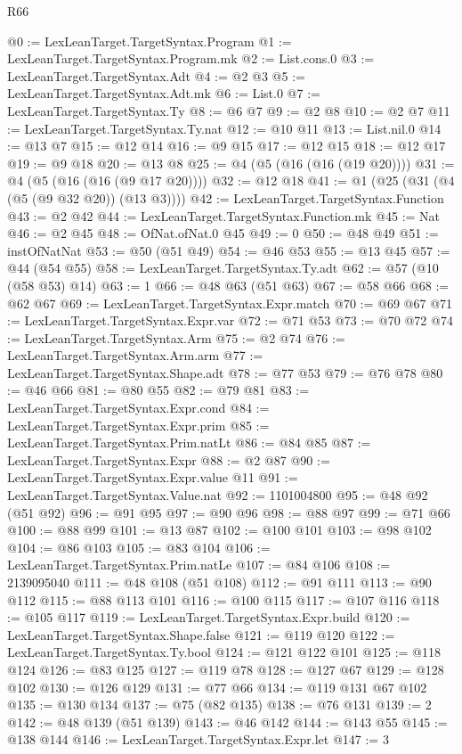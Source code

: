 \begin{lexlean}{R66}
\begin{coremodule}
@0 := LexLeanTarget.TargetSyntax.Program
@1 := LexLeanTarget.TargetSyntax.Program.mk
@2 := List.cons.{0}
@3 := LexLeanTarget.TargetSyntax.Adt
@4 := @2 @3
@5 := LexLeanTarget.TargetSyntax.Adt.mk
@6 := List.{0}
@7 := LexLeanTarget.TargetSyntax.Ty
@8 := @6 @7
@9 := @2 @8
@10 := @2 @7
@11 := LexLeanTarget.TargetSyntax.Ty.nat
@12 := @10 @11
@13 := List.nil.{0}
@14 := @13 @7
@15 := @12 @14
@16 := @9 @15
@17 := @12 @15
@18 := @12 @17
@19 := @9 @18
@20 := @13 @8
@25 := @4 (@5 (@16 (@16 (@19 @20))))
@31 := @4 (@5 (@16 (@16 (@9 @17 @20))))
@32 := @12 @18
@41 := @1 (@25 (@31 (@4 (@5 (@9 @32 @20)) (@13 @3))))
@42 := LexLeanTarget.TargetSyntax.Function
@43 := @2 @42
@44 := LexLeanTarget.TargetSyntax.Function.mk
@45 := Nat
@46 := @2 @45
@48 := OfNat.ofNat.{0} @45
@49 := 0
@50 := @48 @49
@51 := instOfNatNat
@53 := @50 (@51 @49)
@54 := @46 @53
@55 := @13 @45
@57 := @44 (@54 @55)
@58 := LexLeanTarget.TargetSyntax.Ty.adt
@62 := @57 (@10 (@58 @53) @14)
@63 := 1
@66 := @48 @63 (@51 @63)
@67 := @58 @66
@68 := @62 @67
@69 := LexLeanTarget.TargetSyntax.Expr.match
@70 := @69 @67
@71 := LexLeanTarget.TargetSyntax.Expr.var
@72 := @71 @53
@73 := @70 @72
@74 := LexLeanTarget.TargetSyntax.Arm
@75 := @2 @74
@76 := LexLeanTarget.TargetSyntax.Arm.arm
@77 := LexLeanTarget.TargetSyntax.Shape.adt
@78 := @77 @53
@79 := @76 @78
@80 := @46 @66
@81 := @80 @55
@82 := @79 @81
@83 := LexLeanTarget.TargetSyntax.Expr.cond
@84 := LexLeanTarget.TargetSyntax.Expr.prim
@85 := LexLeanTarget.TargetSyntax.Prim.natLt
@86 := @84 @85
@87 := LexLeanTarget.TargetSyntax.Expr
@88 := @2 @87
@90 := LexLeanTarget.TargetSyntax.Expr.value @11
@91 := LexLeanTarget.TargetSyntax.Value.nat
@92 := 1101004800
@95 := @48 @92 (@51 @92)
@96 := @91 @95
@97 := @90 @96
@98 := @88 @97
@99 := @71 @66
@100 := @88 @99
@101 := @13 @87
@102 := @100 @101
@103 := @98 @102
@104 := @86 @103
@105 := @83 @104
@106 := LexLeanTarget.TargetSyntax.Prim.natLe
@107 := @84 @106
@108 := 2139095040
@111 := @48 @108 (@51 @108)
@112 := @91 @111
@113 := @90 @112
@115 := @88 @113 @101
@116 := @100 @115
@117 := @107 @116
@118 := @105 @117
@119 := LexLeanTarget.TargetSyntax.Expr.build
@120 := LexLeanTarget.TargetSyntax.Shape.false
@121 := @119 @120
@122 := LexLeanTarget.TargetSyntax.Ty.bool
@124 := @121 @122 @101
@125 := @118 @124
@126 := @83 @125
@127 := @119 @78
@128 := @127 @67
@129 := @128 @102
@130 := @126 @129
@131 := @77 @66
@134 := @119 @131 @67 @102
@135 := @130 @134
@137 := @75 (@82 @135)
@138 := @76 @131
@139 := 2
@142 := @48 @139 (@51 @139)
@143 := @46 @142
@144 := @143 @55
@145 := @138 @144
@146 := LexLeanTarget.TargetSyntax.Expr.let
@147 := 3

\end{coremodule}
\end{lexlean}
